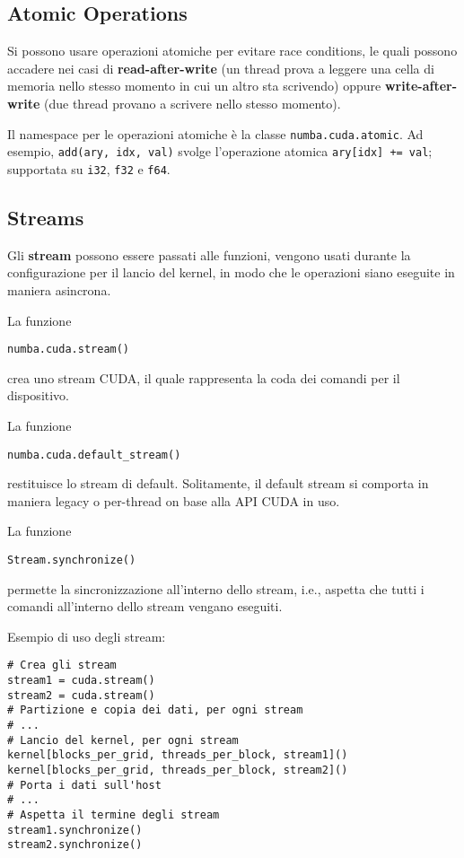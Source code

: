 \subsection{Atomic Operations}

Si possono usare operazioni atomiche per evitare race conditions, le quali possono accadere nei casi di \textbf{read-after-write} (un thread prova a leggere una cella di memoria nello stesso momento in cui un altro sta scrivendo) oppure \textbf{write-after-write} (due thread provano a scrivere nello stesso momento).

Il namespace per le operazioni atomiche è la classe \texttt{numba.cuda.atomic}. Ad esempio, \texttt{add(ary, idx, val)} svolge l'operazione atomica \texttt{ary[idx] += val}; supportata su \texttt{i32}, \texttt{f32} e \texttt{f64}.

\subsection{Streams}

Gli \textbf{stream} possono essere passati alle funzioni, vengono usati durante la configurazione per il lancio del kernel, in modo che le operazioni siano eseguite in maniera asincrona.

La funzione 
\begin{verbatim}
numba.cuda.stream()
\end{verbatim}
crea uno stream CUDA, il quale rappresenta la coda dei comandi per il dispositivo.

La funzione
\begin{verbatim}
numba.cuda.default_stream()
\end{verbatim}
restituisce lo stream di default. Solitamente, il default stream si comporta in maniera legacy o per-thread on base alla API CUDA in uso.

La funzione
\begin{verbatim}
Stream.synchronize()
\end{verbatim}
permette la sincronizzazione all'interno dello stream, i.e., aspetta che tutti i comandi all'interno dello stream vengano eseguiti.

Esempio di uso degli stream:
\begin{verbatim}
# Crea gli stream
stream1 = cuda.stream()
stream2 = cuda.stream()
# Partizione e copia dei dati, per ogni stream
# ...
# Lancio del kernel, per ogni stream
kernel[blocks_per_grid, threads_per_block, stream1]()
kernel[blocks_per_grid, threads_per_block, stream2]()
# Porta i dati sull'host
# ...
# Aspetta il termine degli stream
stream1.synchronize()
stream2.synchronize()
\end{verbatim}


